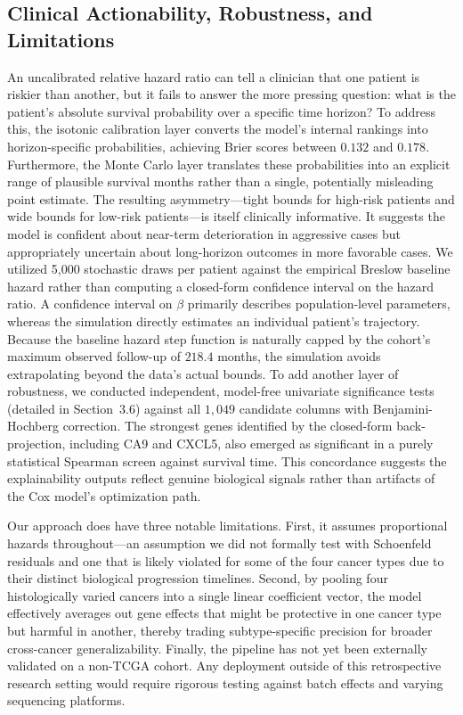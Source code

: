 \documentclass[10pt,a4paper]{article}
\begin{document}
\subsection{Clinical Actionability, Robustness, and Limitations}
An uncalibrated relative hazard ratio can tell a clinician that one patient is riskier than another, but it fails to answer the more pressing question: what is the patient's absolute survival probability over a specific time horizon? To address this, the isotonic calibration layer converts the model's internal rankings into horizon-specific probabilities, achieving Brier scores between $0.132$ and $0.178$. Furthermore, the Monte Carlo layer translates these probabilities into an explicit range of plausible survival months rather than a single, potentially misleading point estimate. The resulting asymmetry---tight bounds for high-risk patients and wide bounds for low-risk patients---is itself clinically informative. It suggests the model is confident about near-term deterioration in aggressive cases but appropriately uncertain about long-horizon outcomes in more favorable cases. We utilized 5,000 stochastic draws per patient against the empirical Breslow baseline hazard rather than computing a closed-form confidence interval on the hazard ratio. A confidence interval on $\beta$ primarily describes population-level parameters, whereas the simulation directly estimates an individual patient's trajectory. Because the baseline hazard step function is naturally capped by the cohort's maximum observed follow-up of $218.4$ months, the simulation avoids extrapolating beyond the data's actual bounds. To add another layer of robustness, we conducted independent, model-free univariate significance tests (detailed in Section~3.6) against all $1{,}049$ candidate columns with Benjamini-Hochberg correction. The strongest genes identified by the closed-form back-projection, including CA9 and CXCL5, also emerged as significant in a purely statistical Spearman screen against survival time. This concordance suggests the explainability outputs reflect genuine biological signals rather than artifacts of the Cox model's optimization path.

Our approach does have three notable limitations. First, it assumes proportional hazards throughout---an assumption we did not formally test with Schoenfeld residuals \cite{schoenfeld1982partial} and one that is likely violated for some of the four cancer types due to their distinct biological progression timelines. Second, by pooling four histologically varied cancers into a single linear coefficient vector, the model effectively averages out gene effects that might be protective in one cancer type but harmful in another, thereby trading subtype-specific precision for broader cross-cancer generalizability. Finally, the pipeline has not yet been externally validated on a non-TCGA cohort. Any deployment outside of this retrospective research setting would require rigorous testing against batch effects and varying sequencing platforms.
\end{document}
